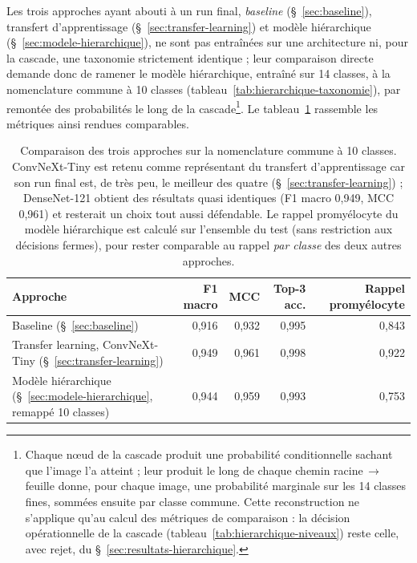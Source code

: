 Les trois approches ayant abouti à un run final, \emph{baseline} (\S~\ref{sec:baseline}), transfert d'apprentissage (\S~\ref{sec:transfer-learning}) et modèle hiérarchique (\S~\ref{sec:modele-hierarchique}), ne sont pas entraînées sur une architecture ni, pour la cascade, une taxonomie strictement identique ; leur comparaison directe demande donc de ramener le modèle hiérarchique, entraîné sur 14 classes, à la nomenclature commune à 10 classes (tableau~\ref{tab:hierarchique-taxonomie}), par remontée des probabilités le long de la cascade\footnote{Chaque n\oe{}ud de la cascade produit une probabilité conditionnelle sachant que l'image l'a atteint ; leur produit le long de chaque chemin racine\,$\to$\,feuille donne, pour chaque image, une probabilité marginale sur les 14 classes fines, sommées ensuite par classe commune. Cette reconstruction ne s'applique qu'au calcul des métriques de comparaison : la décision opérationnelle de la cascade (tableau~\ref{tab:hierarchique-niveaux}) reste celle, avec rejet, du \S~\ref{sec:resultats-hierarchique}.}.
Le tableau~\ref{tab:comparaison-approches} rassemble les métriques ainsi rendues comparables.

\begin{table}[H]
  \centering
  \small
  \renewcommand{\arraystretch}{1.2}
  \begin{tabularx}{\textwidth}{@{}>{\raggedright\arraybackslash}Xrrrr@{}}
    \toprule
    Approche & F1 macro & MCC & Top-3 acc. & Rappel promyélocyte \\
    \midrule
    Baseline (\S~\ref{sec:baseline})             & 0,916 & 0,932 & 0,995 & 0,843 \\
    Transfer learning, ConvNeXt-Tiny (\S~\ref{sec:transfer-learning}) & 0,949 & 0,961 & 0,998 & 0,922 \\
    Modèle hiérarchique (\S~\ref{sec:modele-hierarchique}, remappé 10 classes) & 0,944 & 0,959 & 0,993 & 0,753 \\
    \bottomrule
  \end{tabularx}
  \caption{Comparaison des trois approches sur la nomenclature commune à 10 classes.
  ConvNeXt-Tiny est retenu comme représentant du transfert d'apprentissage car son run final est, de très peu, le meilleur des quatre (\S~\ref{sec:transfer-learning}) ; DenseNet-121 obtient des résultats quasi identiques (F1 macro 0,949, MCC 0,961) et resterait un choix tout aussi défendable.
  Le rappel promyélocyte du modèle hiérarchique est calculé sur l'ensemble du test (sans restriction aux décisions fermes), pour rester comparable au rappel \emph{par classe} des deux autres approches.}
  \label{tab:comparaison-approches}
\end{table}

